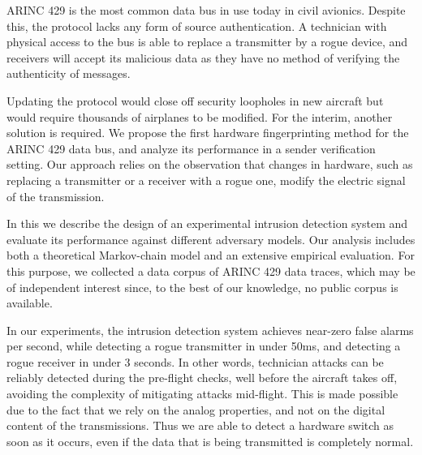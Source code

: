 ARINC 429 is the most common data bus in use today in civil avionics.
Despite this, the protocol lacks any form of source authentication.
A technician with physical access to the bus is able to replace a transmitter by a rogue device, and receivers will accept its malicious data as they have no method of verifying the authenticity of messages.

Updating the protocol would close off security loopholes in new aircraft but would require thousands of airplanes to be modified.
For the interim, another solution is required.
We propose the first hardware fingerprinting method for the ARINC 429 data bus, and analyze its performance in a sender verification setting.
Our approach relies on the observation that changes in hardware, such as replacing a transmitter or a receiver with a rogue one, modify the electric signal of the transmission. 

In this \iftoggle{paper} {paper} {work} we describe the design of an experimental intrusion detection system and evaluate its performance against different adversary models.
Our analysis includes both a theoretical Markov-chain model and an extensive empirical evaluation.
For this purpose, we collected a data corpus of ARINC 429 data traces, which may be of independent interest since, to the best of our knowledge, no public corpus is available.

In our experiments, the intrusion detection system achieves near-zero false alarms per second, while detecting a rogue transmitter in under 50ms, and detecting a rogue receiver in under 3 seconds.
In other words, technician attacks can be reliably detected during the pre-flight checks, well before the aircraft takes off, avoiding the complexity of mitigating attacks mid-flight.
This is made possible due to the fact that we rely on the analog properties, and not on the digital content of the transmissions.
Thus we are able to detect a hardware switch as soon as it occurs, even if the data that is being transmitted is completely normal.

